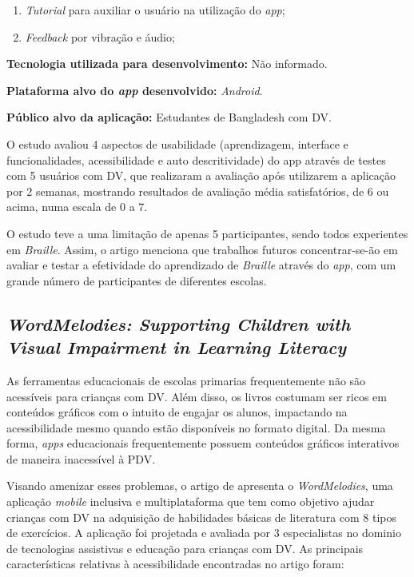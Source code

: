 \begin{enumerate}
\item \emph{Tutorial} para auxiliar o usuário na utilização do \emph{app};
\item \emph{Feedback} por vibração e áudio;
\end{enumerate}

\textbf{Tecnologia utilizada para desenvolvimento:} Não informado.

\textbf{Plataforma alvo do \emph{app} desenvolvido:} \emph{Android}.

\textbf{Público alvo da aplicação:} Estudantes de Bangladesh com DV\@.

O estudo avaliou 4 aspectos de usabilidade (aprendizagem, interface e funcionalidades, acessibilidade e auto descritividade) do app através de testes com 5 usuários com DV, que realizaram a avaliação após utilizarem a aplicação por 2 semanas, mostrando resultados de avaliação média satisfatórios, de 6 ou acima, numa escala de 0 a 7.

O estudo teve a uma limitação de apenas 5 participantes, sendo todos experientes em \emph{Braille}.
Assim, o artigo menciona que trabalhos futuros concentrar-se-ão em avaliar e testar a efetividade do aprendizado de \emph{Braille} através do \emph{app}, com um grande número de participantes de diferentes escolas.


\subsection{\emph{WordMelodies: Supporting Children with Visual Impairment in Learning Literacy}}

As ferramentas educacionais de escolas primarias frequentemente não são acessíveis para crianças com DV\@.
Além disso, os livros costumam ser ricos em conteúdos gráficos com o intuito de engajar os alunos, impactando na acessibilidade mesmo quando estão disponíveis no formato digital.
Da mesma forma, \emph{apps} educacionais frequentemente possuem conteúdos gráficos interativos de maneira inacessível à PDV\@.

Visando amenizar esses problemas, o artigo de  apresenta o \emph{WordMelodies}, uma aplicação \emph{mobile} inclusiva e multiplataforma que tem como objetivo ajudar crianças com DV na adquisição de habilidades básicas de literatura com 8 tipos de exercícios.
A aplicação foi projetada e avaliada por 3 especialistas no dominio de tecnologias assistivas e educação para crianças com DV\@.
As principais características relativas à acessibilidade encontradas no artigo foram:

